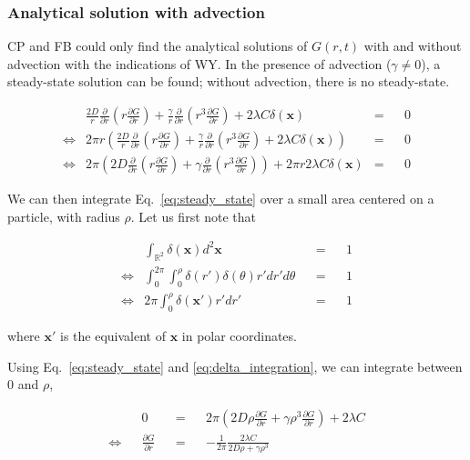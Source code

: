 \subsubsection*{Analytical solution with advection}

CP and FB could only find the analytical solutions of $G(r,t)$ with and without advection with the indications of WY. In the presence of advection ($\gamma\neq0$), a steady-state solution
can be found; without advection, there is no steady-state. 

\begin{align}
  &  \frac{2D}{r}\frac{\partial}{\partial r}\left(r\frac{\partial G}{\partial r}\right)+\frac{\gamma}{r}\frac{\partial}{\partial r}\left(r^{3}\frac{\partial G}{\partial r}\right)+2\lambda C\delta(\boldsymbol{x})\nonumber & = & & 0 \\
\Leftrightarrow & 2\pi r\left(\frac{2D}{r}\frac{\partial}{\partial r}\left(r\frac{\partial G}{\partial r}\right)+\frac{\gamma}{r}\frac{\partial}{\partial r}\left(r^{3}\frac{\partial G}{\partial r}\right)+2\lambda C\delta(\boldsymbol{x})\right)\nonumber & = & & 0 \\
 \Leftrightarrow  & 2\pi\left(2D\frac{\partial}{\partial r}\left(r\frac{\partial G}{\partial r}\right)+\gamma\frac{\partial}{\partial r}\left(r^{3}\frac{\partial G}{\partial r}\right)\right)+2\pi r2\lambda C\delta(\boldsymbol{x}) & = & & 0\label{eq:steady_state}
\end{align}

We can then integrate Eq.~\ref{eq:steady_state} over a small
area centered on a particle, with radius $\rho$. Let us first note
that

\begin{align}
& \int_{\mathbb{R}^{2}}\delta(\boldsymbol{x})d^{2}\boldsymbol{x} & & = & & 1\nonumber \\
\Leftrightarrow & \int_{0}^{2\pi}\int_{0}^{\rho}\delta(r')\delta(\theta)r'dr'd\theta & & = & & 1\nonumber \\
\Leftrightarrow & 2\pi\int_{0}^{\rho}\delta(\boldsymbol{x'})r'dr' & & = & & 1\label{eq:delta_integration}
\end{align}

where $\boldsymbol{x'}$ is the equivalent of $\boldsymbol{x}$ in polar coordinates. 

Using Eq.~\ref{eq:steady_state} and \ref{eq:delta_integration},
we can integrate between 0 and $\rho$, 

\begin{align}
 & & 0 & & = & & 2\pi\left(2D\rho\frac{\partial G}{\partial r}+\gamma\rho^{3}\frac{\partial G}{\partial r}\right)+2\lambda C\nonumber \\
\Leftrightarrow & & \frac{\partial G}{\partial r} & & = & & -\frac{1}{2\pi}\frac{2\lambda C}{2D\rho+\gamma\rho^{3}}\label{eq:deriv_G_r}
\end{align}

